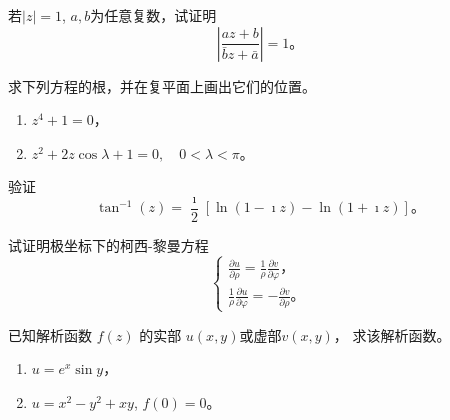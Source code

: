 \documentclass[10pt]{article}
\newenvironment{problem}[2][]{\begin{trivlist}
\item[\hskip \labelsep {\bfseries #1}\hskip \labelsep {\bfseries #2}]}{\end{trivlist}}
\begin{document}
\begin{problem}{1.4}
  若$|z|=1$, $a,b$为任意复数，试证明
  $$
  \left| \frac{a z + b}{\bar{b} z + \bar{a}} \right| = 1 \textrm{。}
  $$
\end{problem}


\begin{problem}{1.5}
  求下列方程的根，并在复平面上画出它们的位置。
  \begin{enumerate}
    \item $z^4 + 1 = 0$，
    \item $z^2 + 2 z \cos \lambda + 1 = 0, \quad 0 < \lambda < \pi$。
  \end{enumerate}
\end{problem}

\begin{problem}{1.6}
验证
$$
\tan^{-1}(z)=\frac{\imath }{2}[\ln (1-\imath z)-\ln (1+\imath z)] \textrm{。}
$$
\end{problem}


\begin{problem}{1.7}
  试证明极坐标下的柯西-黎曼方程
  $$
    \left\{\begin{array}{l}
    \frac{\partial u}{\partial \rho}=\frac{1}{\rho} \frac{\partial v}{\partial \varphi} \textrm{，}\\
    \frac{1}{\rho} \frac{\partial u}{\partial \varphi}=-\frac{\partial v}{\partial \rho} \textrm{。}
    \end{array}\right.
  $$
\end{problem}

\begin{problem}{1.8}
  已知解析函数 $f(z)$  的实部 $u(x, y)$或虚部$ v(x, y)$， 求该解析函数。
  \begin{enumerate}
    \item $u = e^x \sin{y}$，
    \item $u = x^2 - y^2 + xy$, $f(0) = 0$。
  \end{enumerate}
\end{problem}

\end{document}

